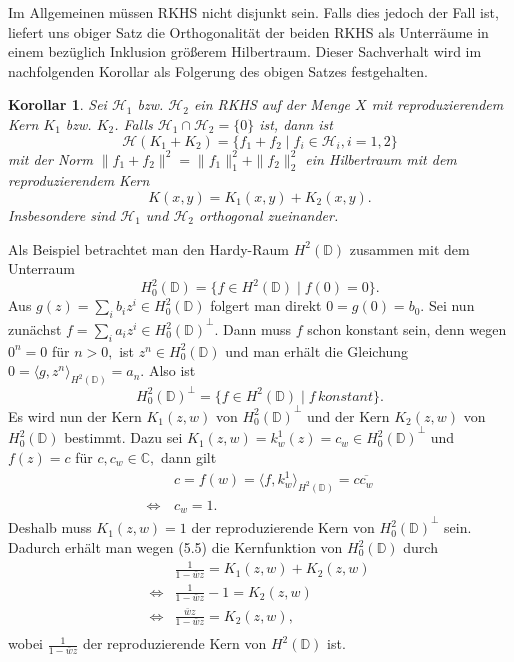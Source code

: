 \documentclass[12pt,titlepage,twoside,cleardoublepage]{article}
\theoremstyle{nummermitklammern}
\newtheorem{korollar}[temp]{Korollar}
\numberwithin{equation}{section}
\newtheorem{korollar}[zahl]{Korollar}
\begin{document}
Im Allgemeinen müssen RKHS nicht disjunkt sein. Falls dies jedoch der Fall ist, liefert uns obiger Satz die Orthogonalität der beiden RKHS als Unterräume in einem  bezüglich Inklusion größerem Hilbertraum. Dieser Sachverhalt wird im nachfolgenden Korollar als Folgerung des obigen Satzes festgehalten.
\begin{korollar}
Sei $\mathcal{H}_1$ bzw. $\mathcal{H}_2$ ein RKHS auf der Menge $X$ mit reproduzierendem Kern $K_1$ bzw. $K_2$. Falls $\mathcal{H}_1 \cap \mathcal{H}_2=\{0\}$ ist, dann ist 
\[
\mathcal{H}(K_1+K_2)=\{f_1+f_2\mid f_i\in \mathcal{H}_i,i=1,2\}
\] 
mit der Norm $\|f_1+f_2\|^2=\|f_1\|^2_1+\|f_2\|^2_2$
ein Hilbertraum mit dem reproduzierendem Kern
\[
K(x,y)=K_1(x,y)+K_2(x,y).
\]
Insbesondere sind $\mathcal{H}_1$ und $\mathcal{H}_2$ orthogonal zueinander.
\end{korollar}

Als Beispiel betrachtet man den Hardy-Raum $H^2(\mathbb{D})$ zusammen mit dem Unterraum 
\[
H_0^2(\mathbb{D})=\{f\in H^2(\mathbb{D})\mid f(0)=0\}.
\]
Aus $g(z)=\sum_i b_iz^i\in H^2_0(\mathbb{D})$ folgert man direkt $0=g(0)=b_0.$ Sei nun zunächst $f=\sum_ia_iz^i\in {H_0^2(\mathbb{D})}^{\bot}.$ Dann muss $f$ schon konstant sein, denn wegen $0^n=0$ für $n>0,$ ist $z^n\in H^2_0(\mathbb{D})$ und man erhält die Gleichung 
$0=\langle g,z^n\rangle_{H^2(\mathbb{D})}=a_n.$ Also ist
  \[
H_0^2(\mathbb{D})^{\bot}=\{f\in H^2(\mathbb{D})\mid f \, konstant\}.  
  \]
Es wird nun der Kern $K_1(z,w)$ von ${H_0^2(\mathbb{D})}^{\bot}$ und der Kern $K_2(z,w)$ von ${H_0^2(\mathbb{D})}$ bestimmt.
Dazu sei $K_1(z,w)=k^1_w(z)=c_w\in {H_0^2(\mathbb{D})}^{\bot}$ und $f(z)=c$ für $c,c_w\in \mathbb{C},$ dann gilt 
\begin{align*}
&c=f(w)=\langle f,k^1_w\rangle_{H^2(\mathbb{D})}=c
\overline{c_w}\\
\Leftrightarrow \,& c_w=1.
\end{align*}
 Deshalb muss $K_1(z,w)=1$ der reproduzierende Kern von ${H_0^2(\mathbb{D})}^{\bot}$ sein. Dadurch erhält man wegen (5.5) die Kernfunktion von $H^2_0(\mathbb{D})$ durch
\begin{align*}
&\frac{1}{1-\bar{w}z}=K_1(z,w)+K_2(z,w)\\
\Leftrightarrow&\frac{1}{1-\bar{w}z}-1=K_2(z,w)\\
\Leftrightarrow&\frac{\bar{w}z}{1-\bar{w}z}=K_2(z,w),\\
\end{align*}
wobei $\frac{1}{1-\bar{w}z}$ der reproduzierende Kern von $H^2(\mathbb{D})$ ist.
\end{document}
